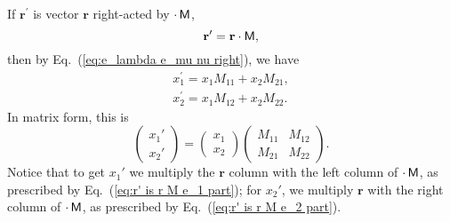 \documentclass[11pt,twocolumn]{article}
\begin{document}
If $\mathbf r^\prime$ is vector $\mathbf r$ right-acted by $\cdot\,\textsf M$, 
\begin{equation}
\label{eq:r' is r M}
\mathbf r^\prime=\mathbf r\cdot\textsf M,
\end{equation}
then by Eq.~(\ref{eq:e_lambda e_mu nu right}), we have 
\begin{eqnarray}
\label{eq:r' is r M e_1 part}
x_1^\prime=x_1M_{11}+x_2M_{21},\\
\label{eq:r' is r M e_2 part}
x_2^\prime=x_1M_{12}+x_2M_{22}.
\end{eqnarray}
In matrix form, this is
\begin{equation}
\label{eq:r' is r M matrix}
\begin{pmatrix}
x_1'\\
x_2'
\end{pmatrix}
=
\begin{pmatrix}
x_1\\
x_2
\end{pmatrix}
\begin{pmatrix}
M_{11}&M_{12}\\
M_{21}&M_{22}
\end{pmatrix}
.
\end{equation}
Notice that to get $x_1'$ we multiply the $\mathbf r$ column with the left column of $\cdot\,\textsf M$, as prescribed by Eq.~(\ref{eq:r' is r M e_1 part}); for $x_2'$, we multiply $\mathbf r$ with the right column of $\cdot\,\textsf M$, as prescribed by Eq.~(\ref{eq:r' is r M e_2 part}).  
\end{document}
